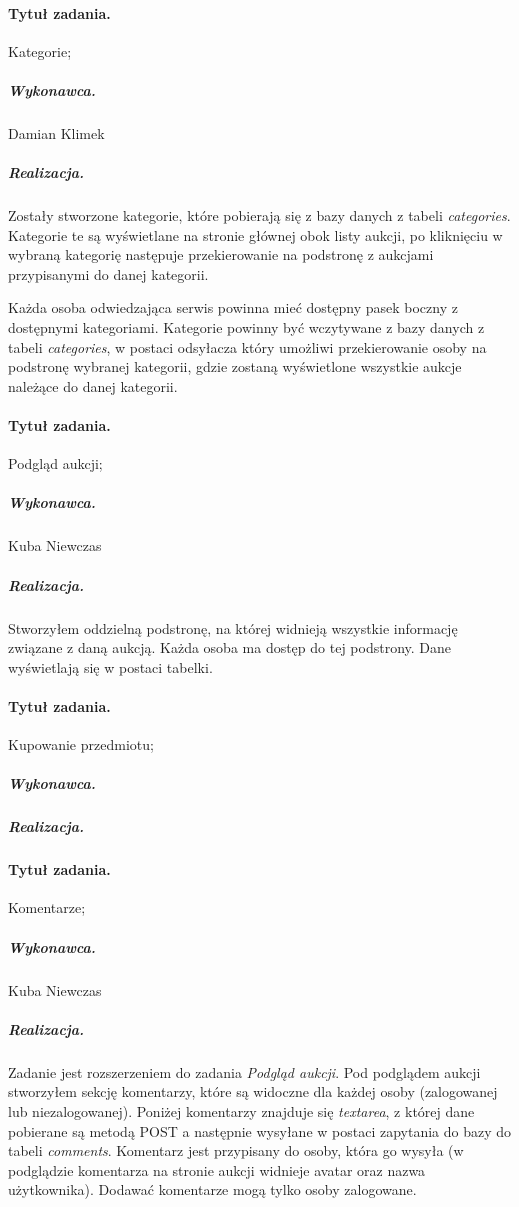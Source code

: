 \documentclass[a4paper]{article}
\begin{document}
	\paragraph{Tytuł zadania.} Kategorie;
	\subparagraph{Wykonawca.} Damian Klimek
	\subparagraph{Realizacja.} Zostały stworzone kategorie, które pobierają się z bazy danych z tabeli \emph{categories}. Kategorie te są wyświetlane na stronie głównej obok listy aukcji, po kliknięciu w wybraną kategorię następuje przekierowanie na podstronę z aukcjami przypisanymi do danej kategorii.
	
	
	Każda osoba odwiedzająca serwis powinna mieć dostępny pasek boczny z dostępnymi kategoriami. Kategorie powinny być wczytywane z bazy danych z tabeli \emph{categories}, w postaci odsyłacza który umożliwi przekierowanie osoby na podstronę wybranej kategorii, gdzie zostaną wyświetlone wszystkie aukcje należące do danej kategorii. 
	
	
	\paragraph{Tytuł zadania.} Podgląd aukcji;
	\subparagraph{Wykonawca.} Kuba Niewczas
	\subparagraph{Realizacja.} Stworzyłem oddzielną podstronę, na której widnieją wszystkie informację związane z daną aukcją. Każda osoba ma dostęp do tej podstrony. Dane wyświetlają się w postaci tabelki. 
	
	\paragraph{Tytuł zadania.} Kupowanie przedmiotu;
	\subparagraph{Wykonawca.} 
	\subparagraph{Realizacja.}
	
	\paragraph{Tytuł zadania.} Komentarze;
	\subparagraph{Wykonawca.} Kuba Niewczas
	\subparagraph{Realizacja.} Zadanie jest rozszerzeniem do zadania \emph{Podgląd aukcji}. Pod podglądem aukcji stworzyłem sekcję komentarzy, które są widoczne dla każdej osoby (zalogowanej lub niezalogowanej). Poniżej komentarzy znajduje się \emph{textarea}, z której dane pobierane są metodą POST a następnie wysyłane w postaci zapytania do bazy do tabeli \emph{comments}. Komentarz jest przypisany do osoby, która go wysyła (w podglądzie komentarza na stronie aukcji widnieje avatar oraz nazwa użytkownika). Dodawać komentarze mogą tylko osoby zalogowane.
	
\end{document}
